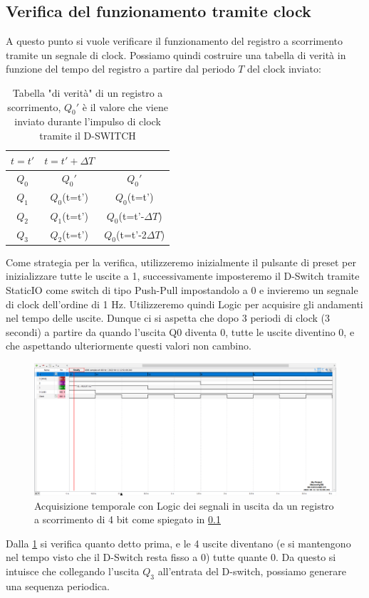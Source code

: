 \documentclass[10pt, a4paper, italian]{article}
\begin{document}
\subsection{Verifica del funzionamento tramite clock}\label{sbs: clock_reg}
A questo punto si vuole verificare il funzionamento del registro a scorrimento tramite un segnale di clock.
Possiamo quindi costruire una tabella di verità in funzione del tempo del registro a partire dal periodo $T$ del clock inviato:
\begin{table}[htbp]
\centering
\begin{tabular}{c|cc}
\toprule
$t=t'$ & $t=t' + \Delta T$ & $ $\\
\midrule
\midrule
$Q_0$&$Q_0'$&$Q_0'$\\
$Q_1$&$Q_0$(t=t')&$Q_0$(t=t')\\
$Q_2$&$Q_1$(t=t')&$Q_0$(t=t'-$\Delta T$)\\
$Q_3$&$Q_2$(t=t')&$Q_0$(t=t'-2$\Delta T$)\\
\bottomrule
\end{tabular}
\caption{Tabella "di verità" di un registro a scorrimento, $Q_0'$ è il valore che viene inviato durante l'impulso di clock tramite il D-SWITCH
\label{tab: S-register}}
\end{table}
Come strategia per la verifica, utilizzeremo inizialmente il pulsante di preset per inizializzare tutte le uscite a 1, successivamente imposteremo il D-Switch tramite StaticIO come switch di tipo Push-Pull impostandolo a 0
e invieremo un segnale di clock dell'ordine di 1 Hz. Utilizzeremo quindi Logic per acquisire gli andamenti nel tempo delle uscite.
Dunque ci si aspetta che dopo 3 periodi di clock (3 secondi) a partire da quando l'uscita Q0 diventa 0, tutte le uscite diventino 0, e che aspettando ulteriormente questi valori non cambino.
\begin{figure}[htbp]
\centering
	\includegraphics[width=\textwidth]{3.c}
	\caption{Acquisizione temporale con Logic dei segnali in uscita da un registro a scorrimento di 4 bit come spiegato in \cref{sbs: clock_reg} \label{fig: Shift_reg_clock}}
\end{figure}
Dalla \cref{fig: Shift_reg_clock} si verifica quanto detto prima, e le 4 uscite diventano (e si mantengono nel tempo visto che il D-Switch resta fisso a 0) tutte quante 0.
Da questo si intuisce che collegando l'uscita $Q_3$ all'entrata del D-switch, possiamo generare una sequenza periodica.
\end{document}
